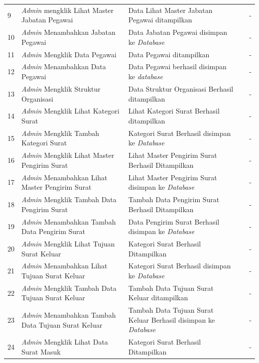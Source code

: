 \begin{enumerate}
{\begin{longtable}{p{0.5cm} p{4cm} p{4cm} p{0.5cm} p{1cm}}
		9 & \textit{Admin} mengklik Lihat Master Jabatan Pegawai & Data Lihat Master Jabatan Pegawai ditampilkan & \checkmark & -\\
		10 & \textit{Admin} Menambahkan Jabatan Pegawai & Data Jabatan Pegawai disimpan ke \textit{Database}  & \checkmark & -\\
		11 & \textit{Admin} Mengklik Data Pegawai & Data Pegawai ditampilkan  & \checkmark & -\\
		12 & \textit{Admin} Menambahkan Data Pegawai & Data Pegawai berhasil disimpan ke \textit{database}  & \checkmark & -\\
		13 & \textit{Admin} Mengklik Struktur Organisasi & Data Struktur Organisasi Berhasil ditampilkan  & \checkmark & -\\
		14 & \textit{Admin} Mengklik Lihat Kategori Surat & Lihat Kategori Surat Berhasil ditampilkan  & \checkmark & -\\
		15 & \textit{Admin} Mengklik Tambah Kategori Surat & Kategori Surat Berhasil disimpan ke \textit{Database}  & \checkmark & -\\
		16 & \textit{Admin} Mengklik Lihat Master Pengirim Surat & Lihat Master Pengirim Surat Berhasil Ditampilkan  & \checkmark & -\\
		17 & \textit{Admin} Menambahkan Lihat Master Pengirim Surat & Lihat Master Pengirim Surat disimpan ke \textit{Database}  & \checkmark & -\\
		18 & \textit{Admin} Mengklik Tambah Data Pengirim Surat & Tambah Data Pengirim Surat Berhasil Ditampilkan  & \checkmark & -\\
		19 & \textit{Admin} Menambahkan Tambah Data Pengirim Surat & Data Pengirim Surat Berhasil disimpan ke \textit{Database}  & \checkmark & -\\
		20 & \textit{Admin} Mengklik Lihat Tujuan Surat Keluar & Kategori Surat Berhasil Ditampilkan  & \checkmark & -\\
		21 & \textit{Admin} Menambahkan Lihat Tujuan Surat Keluar & Kategori Surat Berhasil disimpan ke \textit{Database}  & \checkmark & -\\
		22 & \textit{Admin} Mengklik Tambah Data Tujuan Surat Keluar & Tambah Data Tujuan Surat Keluar ditampilkan  & \checkmark & -\\
		23 & \textit{Admin} Menambahkan Tambah Data Tujuan Surat Keluar & Tambah Data Tujuan Surat Keluar Berhasil disimpan ke \textit{Database}  & \checkmark & -\\
		24 & \textit{Admin} Mengklik Lihat Data Surat Masuk & Kategori Surat Berhasil Ditampilkan  & \checkmark & -\\

\end{longtable}}
\end{enumerate}
